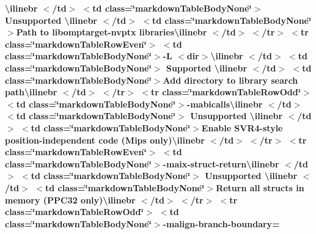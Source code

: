\begin{longtabu}
{\bfseries{{\ttfamily \textbackslash{}ilinebr \texorpdfstring{$<$}{<}/td\texorpdfstring{$>$}{>} \texorpdfstring{$<$}{<}td class=\char`\"{}markdown\+Table\+Body\+None\char`\"{}\texorpdfstring{$>$}{>} Unsupported \textbackslash{}ilinebr \texorpdfstring{$<$}{<}/td\texorpdfstring{$>$}{>} \texorpdfstring{$<$}{<}td class=\char`\"{}markdown\+Table\+Body\+None\char`\"{}\texorpdfstring{$>$}{>}}Path to libomptarget-\/nvptx libraries{\ttfamily \textbackslash{}ilinebr \texorpdfstring{$<$}{<}/td\texorpdfstring{$>$}{>} \texorpdfstring{$<$}{<}/tr\texorpdfstring{$>$}{>} \texorpdfstring{$<$}{<}tr class=\char`\"{}markdown\+Table\+Row\+Even\char`\"{}\texorpdfstring{$>$}{>} \texorpdfstring{$<$}{<}td class=\char`\"{}markdown\+Table\+Body\+None\char`\"{}\texorpdfstring{$>$}{>}}-\/L $<$dir$>${\ttfamily \textbackslash{}ilinebr \texorpdfstring{$<$}{<}/td\texorpdfstring{$>$}{>} \texorpdfstring{$<$}{<}td class=\char`\"{}markdown\+Table\+Body\+None\char`\"{}\texorpdfstring{$>$}{>} Supported \textbackslash{}ilinebr \texorpdfstring{$<$}{<}/td\texorpdfstring{$>$}{>} \texorpdfstring{$<$}{<}td class=\char`\"{}markdown\+Table\+Body\+None\char`\"{}\texorpdfstring{$>$}{>}}Add directory to library search path{\ttfamily \textbackslash{}ilinebr \texorpdfstring{$<$}{<}/td\texorpdfstring{$>$}{>} \texorpdfstring{$<$}{<}/tr\texorpdfstring{$>$}{>} \texorpdfstring{$<$}{<}tr class=\char`\"{}markdown\+Table\+Row\+Odd\char`\"{}\texorpdfstring{$>$}{>} \texorpdfstring{$<$}{<}td class=\char`\"{}markdown\+Table\+Body\+None\char`\"{}\texorpdfstring{$>$}{>}}-\/mabicalls{\ttfamily \textbackslash{}ilinebr \texorpdfstring{$<$}{<}/td\texorpdfstring{$>$}{>} \texorpdfstring{$<$}{<}td class=\char`\"{}markdown\+Table\+Body\+None\char`\"{}\texorpdfstring{$>$}{>} Unsupported \textbackslash{}ilinebr \texorpdfstring{$<$}{<}/td\texorpdfstring{$>$}{>} \texorpdfstring{$<$}{<}td class=\char`\"{}markdown\+Table\+Body\+None\char`\"{}\texorpdfstring{$>$}{>}}Enable SVR4-\/style position-\/independent code (Mips only){\ttfamily \textbackslash{}ilinebr \texorpdfstring{$<$}{<}/td\texorpdfstring{$>$}{>} \texorpdfstring{$<$}{<}/tr\texorpdfstring{$>$}{>} \texorpdfstring{$<$}{<}tr class=\char`\"{}markdown\+Table\+Row\+Even\char`\"{}\texorpdfstring{$>$}{>} \texorpdfstring{$<$}{<}td class=\char`\"{}markdown\+Table\+Body\+None\char`\"{}\texorpdfstring{$>$}{>}}-\/maix-\/struct-\/return{\ttfamily \textbackslash{}ilinebr \texorpdfstring{$<$}{<}/td\texorpdfstring{$>$}{>} \texorpdfstring{$<$}{<}td class=\char`\"{}markdown\+Table\+Body\+None\char`\"{}\texorpdfstring{$>$}{>} Unsupported \textbackslash{}ilinebr \texorpdfstring{$<$}{<}/td\texorpdfstring{$>$}{>} \texorpdfstring{$<$}{<}td class=\char`\"{}markdown\+Table\+Body\+None\char`\"{}\texorpdfstring{$>$}{>}}Return all structs in memory (PPC32 only){\ttfamily \textbackslash{}ilinebr \texorpdfstring{$<$}{<}/td\texorpdfstring{$>$}{>} \texorpdfstring{$<$}{<}/tr\texorpdfstring{$>$}{>} \texorpdfstring{$<$}{<}tr class=\char`\"{}markdown\+Table\+Row\+Odd\char`\"{}\texorpdfstring{$>$}{>} \texorpdfstring{$<$}{<}td class=\char`\"{}markdown\+Table\+Body\+None\char`\"{}\texorpdfstring{$>$}{>}}-\/malign-\/branch-\/boundary=}}


\end{longtabu}
